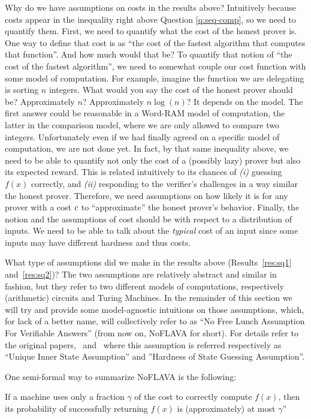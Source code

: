 Why do we have assumptions on costs in the results above?
Intuitively because costs appear in the inequality right above Question \ref{q:seq-comp}, so we need to quantify them.
First, we need to quantify what the cost of the honest prover is. One way to define that cost is as ``the cost of the fastest algorithm that computes that function''.
And how much would that be? To quantify that notion of ``the cost of the fastest algorithm'', we need to somewhat couple our cost function with some model of computation.
For example, imagine the function we are delegating is sorting $n$ integers. What would you say the cost of the honest prover should be? Approximately $n$? Approximately $n \log(n)$?
It depends on the model. The first answer could be reasonable in a Word-RAM model of computation, the latter in the comparison model, where we are only allowed to compare two integers.
Unfortunately even if we had finally agreed on a specific model of computation, we are not done yet. In fact, by that same inequality above, we need to be able to quantify not only the cost of a (possibly lazy) prover
but also its expected reward. This is related intuitively to its chances of \emph{(i)} guessing $f(x)$ correctly, and \emph{(ii)} responding to the verifier's challenges
in a way similar the honest prover. Therefore, we need assumptions on how likely it is for any prover with a cost $c$ to ``approximate'' the honest prover's behavior.
Finally, the notion and the assumptions of cost should be with respect to a distribution of inputs. We need to be able to talk about the \emph{typical} cost of an input since some inputs may have different hardness and thus costs. 

\newcommand{\NoFLAVA}{\textsf{ NoFLAVA }}
What type of assumptions did we make in the results above (Results~\ref{res:sq1} and~\ref{res:sq2})? The two assumptions are relatively abstract and similar in fashion, but they refer to two different models of computations, respectively (arithmetic) circuits and Turing Machines. In the remainder of this section we will try and provide some model-agnostic intuitions on those assumptions, which, for lack of a better name, will collectively refer  to as ``No Free Lunch Assumption For Verifiable Answers'' (from now on, \NoFLAVA for short). For details refer to the original papers,~\cite{cg15} and~\cite{cg17} where this assumption is referred respectively as ``Unique Inner State Assumption'' and ''Hardness of State Guessing Assumption''.

One semi-formal way to summarize \NoFLAVA is the following: 
\begin{displayquote}
	If a machine uses only a fraction $\gamma$ of the cost to correctly compute $f(x)$, then its probability of successfully returning $f(x)$ is (approximately) at most $\gamma$''
\end{displayquote}

